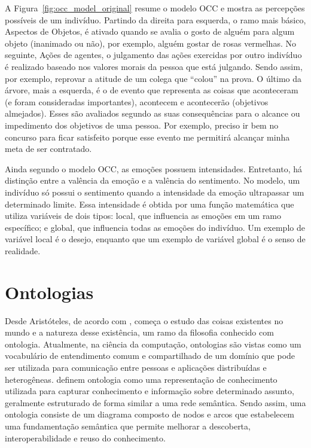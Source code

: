 A Figura~\ref{fig:occ_model_original} resume o modelo OCC e mostra as
percepções possíveis de um indivíduo.  Partindo da direita para esquerda, o
ramo mais básico, Aspectos de Objetos, é ativado quando se avalia o gosto de
alguém para algum objeto (inanimado ou não), por exemplo, alguém gostar de
rosas vermelhas.  No seguinte, Ações de agentes, o julgamento das ações
exercidas por outro indivíduo é realizado baseado nos valores morais da pessoa
que está julgando.  Sendo assim, por exemplo, reprovar a atitude de um colega
que ``colou'' na prova. O último da árvore, mais a esquerda, é o de evento que
representa as coisas que aconteceram (e foram consideradas importantes),
acontecem e acontecerão (objetivos almejados). Esses são avaliados segundo as
suas consequências para o alcance ou impedimento dos objetivos de uma pessoa.
Por exemplo, preciso ir bem no concurso para ficar satisfeito porque esse
evento me permitirá alcançar minha meta de ser contratado.

Ainda segundo o modelo OCC, as emoções possuem intensidades. Entretanto, há
distinção entre a valência da emoção e a valência do sentimento. No modelo, um
indivíduo só possui o sentimento quando a intensidade da emoção ultrapassar um
determinado limite.  Essa intensidade é obtida por uma função matemática que
utiliza variáveis de dois tipos: local, que influencia as emoções em um ramo
específico; e global, que influencia todas as emoções do indivíduo.  Um
exemplo de variável local é o desejo, enquanto que um exemplo de variável
global é o senso de realidade.

\section{Ontologias}

 Desde Aristóteles, de acordo com \citet{wks2008towards},
começa o estudo das coisas existentes no mundo e a natureza desse existência,
um ramo da filosofia conhecido com ontologia.  Atualmente, na ciência da
computação, ontologias são vistas como um vocabulário de entendimento comum e
compartilhado de um domínio que pode ser utilizada para comunicação entre
pessoas e aplicações distribuídas e heterogêneas.  \citet{ontoly2004Approach}
definem ontologia como uma representação de conhecimento utilizada para
capturar conhecimento e informação sobre determinado assunto, geralmente
estruturado de forma similar a uma rede semântica. Sendo assim, uma ontologia
consiste de um diagrama composto de nodos e arcos que estabelecem uma
fundamentação semântica que permite melhorar a descoberta, interoperabilidade
e reuso do conhecimento.

